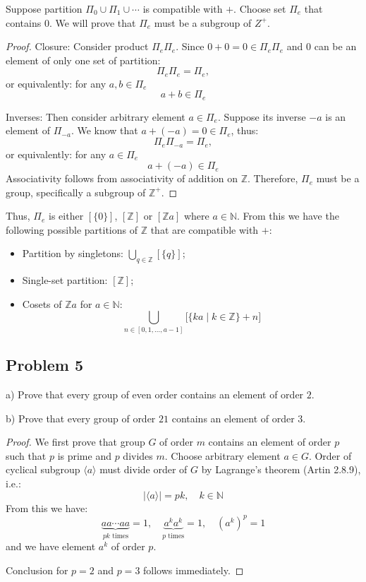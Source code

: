 \documentclass{article}
\theoremstyle{definition}
\newcommand{\Z}{\mathbb{Z}}
\newcommand{\N}{\mathbb{N}}
\begin{document}
Suppose partition $\Pi_0 \cup \Pi_1 \cup \cdots$ is compatible with $+$.
Choose set $\Pi_e$ that contains $0$.
We will prove that $\Pi_e$ must be a subgroup of $Z^+$.

\begin{proof}

Closure: Consider product $\Pi_e \Pi_e$.
Since $0+0 = 0 \in \Pi_e \Pi_e$ and $0$ can be an element of only one set of partition:
\[ \Pi_e \Pi_e = \Pi_e, \]
or equivalently: for any $a,b \in \Pi_e$
\[ a + b \in \Pi_e \]

Inverses: Then consider arbitrary element $a \in \Pi_e$.
Suppose its inverse $-a$ is an element of $\Pi_{-a}$. We know that $a+(-a) = 0 \in \Pi_e$, thus:
\[ \Pi_e \Pi_{-a} = \Pi_e, \]
or equivalently: for any $a \in \Pi_e$
\[ a + (-a) \in \Pi_e \]
Associativity follows from associativity of addition on $\Z$.
Therefore, $\Pi_e$ must be a group, specifically a subgroup of $\Z^+$.

\end{proof}

Thus, $\Pi_e$ is either $[\{0\}]$, $[\Z]$ or $[\Z a]$ where $a \in \N$. From this we have the following possible partitions of $\Z$ that are compatible with $+$:
\begin{itemize}
    \item Partition by singletons: $\bigcup_{q \in \Z} [\{q\}]$;
    \item Single-set partition: $[\Z]$;
    \item Cosets of $\Z a$ for $a \in \N$:
    \[ \bigcup_{n\in [0, 1, \dots, a-1]} \biggl[ \{ ka \mid k \in \Z \} + n \biggr] \]
\end{itemize}


\subsection*{Problem 5}

\begin{tcolorbox}
a) Prove that every group of even order contains an element of order $2$.

b) Prove that every group of order $21$ contains an element of order $3$.
\end{tcolorbox}

\begin{proof}

We first prove that group $G$ of order $m$ contains an element of order $p$ such that $p$ is prime and $p$ divides $m$.
Choose arbitrary element $a \in G$.
Order of cyclical subgroup $\langle a \rangle$ must divide order of $G$ by Lagrange's theorem (Artin 2.8.9), i.e.:
\[ \bigl| \langle a \rangle \bigr| = pk, \quad k \in \N \]
From this we have:
\[ \underbrace{ a a \cdots a a }_{pk \text{ times}} = 1, \quad \underbrace{ a^k a^k }_{p \text{ times}} = 1, \quad (a^k)^p = 1 \]
and we have element $a^k$ of order $p$.

Conclusion for $p = 2$ and $p = 3$ follows immediately.

\end{proof}
\end{document}
